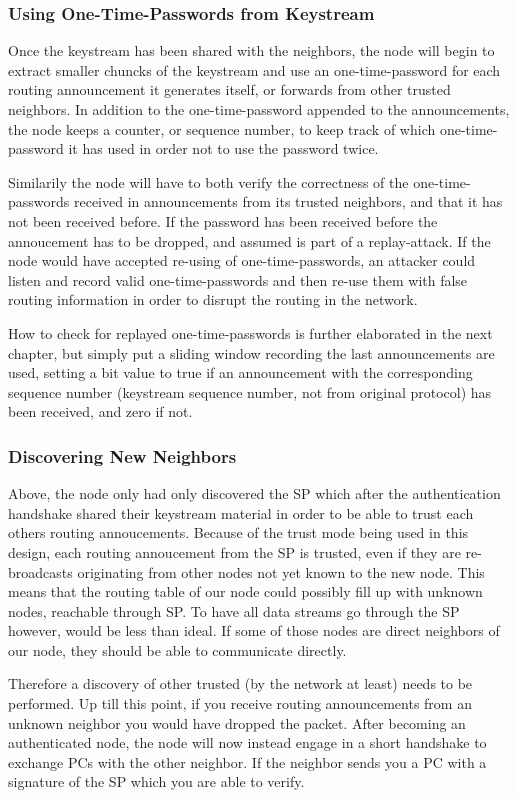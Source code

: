 \subsubsection*{Using One-Time-Passwords from Keystream}
Once the keystream has been shared with the neighbors, the node will begin to
extract smaller chuncks of the keystream and use an one-time-password for each
routing announcement it generates itself, or forwards from other trusted
neighbors. In addition to the one-time-password appended to the announcements,
the node keeps a counter, or sequence number, to keep track of which
one-time-password it has used in order not to use the password twice.

Similarily the node will have to both verify the correctness of the
one-time-passwords received in announcements from its trusted neighbors, and
that it has not been received before. If the password has been received before
the annoucement has to be dropped, and assumed is part of a replay-attack. If
the node would have accepted re-using of one-time-passwords, an attacker could
listen and record valid one-time-passwords and then re-use them with false
routing information in order to disrupt the routing in the network.

How to check for replayed one-time-passwords is further elaborated in the next
chapter, but simply put a sliding window recording the last announcements are
used, setting a bit value to true if an announcement with the corresponding
sequence number (keystream sequence number, not from original protocol) has been
received, and zero if not.

\subsubsection*{Discovering New Neighbors}
Above, the node only had only discovered the \ac{SP} which after the
authentication handshake shared their keystream material in order to be able to
trust each others routing annoucements. Because of the trust mode being used in
this design, each routing annoucement from the \ac{SP} is trusted, even if they
are re-broadcasts originating from other nodes not yet known to the new node.
This means that the routing table of our node could possibly fill up with
unknown nodes, reachable through \ac{SP}. To have all data streams go through
the \ac{SP} however, would be less than ideal. If some of those nodes are direct
neighbors of our node, they should be able to communicate directly.

Therefore a discovery of other trusted (by the network at least) needs to be
performed. Up till this point, if you receive routing announcements from an
unknown neighbor you would have dropped the packet. After becoming an
authenticated node, the node will now instead engage in a short handshake to
exchange \acp{PC} with the other neighbor. If the neighbor sends you a \ac{PC}
with a signature of the \ac{SP} which you are able to verify.

